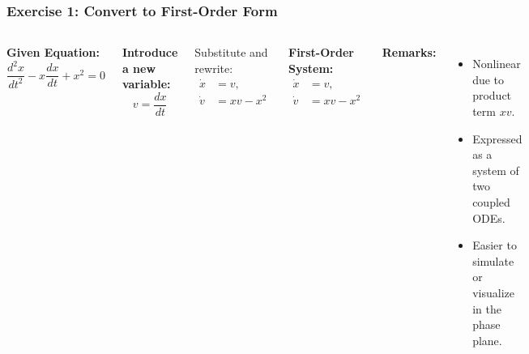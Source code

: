 \documentclass{beamer}
\begin{document}
\begin{frame}
\frametitle{Exercise 1: Convert to First-Order Form}
\scriptsize
\begin{columns}[T,onlytextwidth]

  \textbf{Given Equation:}
  \[
    \frac{d^2x}{dt^2} - x\frac{dx}{dt} + x^2 = 0
  \]

  \textbf{Introduce a new variable:}
  \[
    v = \frac{dx}{dt}
  \]

  Substitute and rewrite:
  \[
    \begin{aligned}
      \dot{x} &= v,\\[-2pt]
      \dot{v} &= x v - x^2
    \end{aligned}
  \]

  \textbf{First-Order System:}
  \[
    \begin{aligned}
      \dot{x} &= v,\\[-2pt]
      \dot{v} &= x v - x^2
    \end{aligned}
  \]

  \vspace{-2pt}
  \textbf{Remarks:}
  \vspace{-4pt}
  \begin{itemize}\itemsep1.5pt
    \item Nonlinear due to product term \(xv\).
    \item Expressed as a system of two coupled ODEs.
    \item Easier to simulate or visualize in the phase plane.
  \end{itemize}

\end{columns}
\end{frame}
\end{document}
